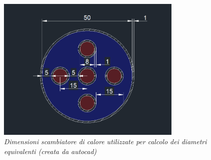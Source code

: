 \documentclass[a4paper,10pt]{article}                                                                                       %
\begin{document}
\begin{figure}[H]                                                                                                           %
  \caption{\textit{Dimensioni scambiatore di calore utilizzate per calcolo dei diametri equivalenti (creata da autocad)}}   %
  \label{fig:he}                                                                                                            %
  \vspace{3mm}                                                                                                              %
  \centering                                                                                                                %
  \includegraphics[width=0.8\textwidth]{../final_doc/code_exports/imgs/heat_exchanger.png}                                  %
\end{figure}                                                                                                                %
\clearpage                                                                                                                  %

\end{document}
